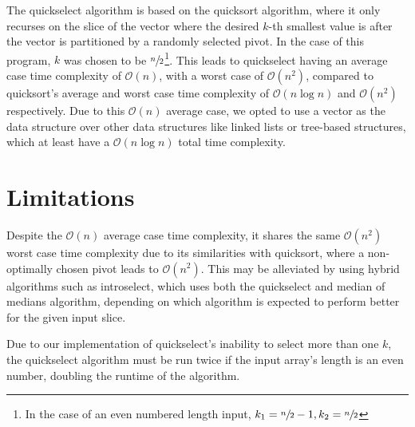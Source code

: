 \documentclass{report}
\begin{document}
The quickselect algorithm is based on the quicksort algorithm, where it only recurses on the slice of the vector where the desired \(k\)-th smallest value is after the vector is partitioned by a randomly selected pivot. In the case of this program, \(k\) was chosen to be \(\sfrac{n}{2}\)\footnote{In the case of an even numbered length input, \(k_1 = \sfrac{n}{2} - 1, k_2 = \sfrac{n}{2}\)}. This leads to quickselect having an average case time complexity of \(\mathcal{O}(n)\), with a worst case of \(\mathcal{O}(n^2)\), compared to quicksort's average and worst case time complexity of \(\mathcal{O}(n \log{n})\) and \(\mathcal{O}(n^2)\) respectively. Due to this \(\mathcal{O}(n)\) average case, we opted to use a vector as the data structure over other data structures like linked lists or tree-based structures, which at least have a \(\mathcal{O}(n \log{n})\) total time complexity.

\section{Limitations}
Despite the \(\mathcal{O}(n)\) average case time complexity, it shares the same \(\mathcal{O}(n^2)\) worst case time complexity due to its similarities with quicksort, where a non-optimally chosen pivot leads to \(\mathcal{O}(n^2)\). This may be alleviated by using hybrid algorithms such as introselect, which uses both the quickselect and median of medians algorithm, depending on which algorithm is expected to perform better for the given input slice.

Due to our implementation of quickselect's inability to select more than one \(k\), the quickselect algorithm must be run twice if the input array's length is an even number, doubling the runtime of the algorithm.
\end{document}
